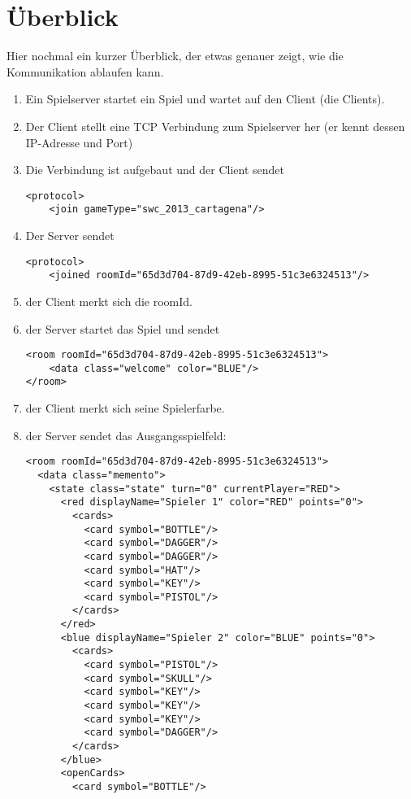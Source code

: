 \documentclass[12pt,a4paper, ngerman, oneside]{scrartcl}
\begin{document}
\newpage
\part{Überblick}
Hier nochmal ein kurzer Überblick, der etwas genauer zeigt, wie die Kommunikation ablaufen kann.\bigskip\\

\begin{enumerate}
\item Ein Spielserver startet ein Spiel und wartet auf den Client (die Clients).
\item Der Client stellt eine TCP Verbindung zum Spielserver her (er kennt dessen IP-Adresse und Port)
\item Die Verbindung ist aufgebaut und der Client sendet \begin{verbatim}
<protocol>
    <join gameType="swc_2013_cartagena"/>
\end{verbatim}
\item Der Server sendet \begin{verbatim}
<protocol>
    <joined roomId="65d3d704-87d9-42eb-8995-51c3e6324513"/>
\end{verbatim}
\item der Client merkt sich die roomId.
\item der Server startet das Spiel und sendet \begin{verbatim}
<room roomId="65d3d704-87d9-42eb-8995-51c3e6324513">
    <data class="welcome" color="BLUE"/>
</room>
\end{verbatim}
\item der Client merkt sich seine Spielerfarbe.
\item der Server sendet das Ausgangsspielfeld: 
\begin{verbatim}
<room roomId="65d3d704-87d9-42eb-8995-51c3e6324513">
  <data class="memento">
    <state class="state" turn="0" currentPlayer="RED">
      <red displayName="Spieler 1" color="RED" points="0">
        <cards>
          <card symbol="BOTTLE"/>
          <card symbol="DAGGER"/>
          <card symbol="DAGGER"/>
          <card symbol="HAT"/>
          <card symbol="KEY"/>
          <card symbol="PISTOL"/>
        </cards>
      </red>
      <blue displayName="Spieler 2" color="BLUE" points="0">
        <cards>
          <card symbol="PISTOL"/>
          <card symbol="SKULL"/>
          <card symbol="KEY"/>
          <card symbol="KEY"/>
          <card symbol="KEY"/>
          <card symbol="DAGGER"/>
        </cards>
      </blue>
      <openCards>
        <card symbol="BOTTLE"/>

\end{verbatim}
\end{enumerate}
\end{document}
